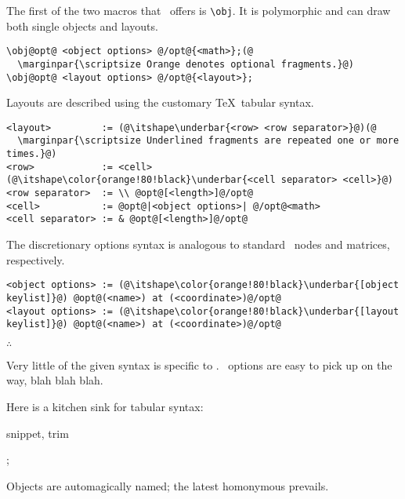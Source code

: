 The first of the two macros that \koDi\ offers is \lstinline|\obj|.
It is polymorphic and can draw both single objects and layouts.

\begin{lstlisting}
\obj@opt@ <object options> @/opt@{<math>};(@
  \marginpar{\scriptsize Orange denotes optional fragments.}@)
\obj@opt@ <layout options> @/opt@{<layout>};
\end{lstlisting}

Layouts are described using the customary \TeX\ tabular syntax.

\begin{lstlisting}
<layout>         := (@\itshape\underbar{<row> <row separator>}@)(@
  \marginpar{\scriptsize Underlined fragments are repeated one or more times.}@)
<row>            := <cell> (@\itshape\color{orange!80!black}\underbar{<cell separator> <cell>}@)
<row separator>  := \\ @opt@[<length>]@/opt@
<cell>           := @opt@|<object options>| @/opt@<math>
<cell separator> := & @opt@[<length>]@/opt@
\end{lstlisting}

The discretionary options syntax is analogous to standard \TikZ\ nodes and
matrices, respectively.

\begin{lstlisting}
<object options> := (@\itshape\color{orange!80!black}\underbar{[object keylist]}@) @opt@(<name>) at (<coordinate>)@/opt@
<layout options> := (@\itshape\color{orange!80!black}\underbar{[layout keylist]}@) @opt@(<name>) at (<coordinate>)@/opt@
\end{lstlisting}

\hfill$\therefore$\hfill\null

Very little of the given syntax is specific to \koDi.
\TikZ\ options are easy to pick up on the way,
blah blah blah.

Here is a kitchen sink for tabular syntax:

\begin{tcblisting}{snippet, trim}
\begin{kodi}[square=3em]
;
\end{kodi}
\end{tcblisting}

Objects are automagically named; the latest homonymous prevails.

